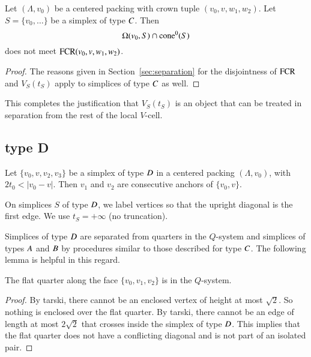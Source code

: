 \begin{lemma}
Let $(\Lambda,v_0)$ be a centered packing with crown tuple $(v_0,v,w_1,w_2)$.
Let $S=\{v_0,\ldots\}$ be a simplex of type $C$. Then
$$\Omega(v_0,S) \cap {\operatorname{cone}}^0(S)$$
does not meet ${\operatorname{FCR}}(v_0,v,w_1,w_2)$.
\end{lemma}

\begin{proof}
The reasons given in Section~\ref{sec:separation} for the
disjointness of ${\operatorname{FCR}}$ and $V_S(t_S)$ apply to simplices of
type $C$ as well. 
\end{proof}


This completes the justification that
$V_S(t_S)$ is an object that can be treated in separation from the
rest of the local $V$-cell.

\subsection{type D}%



\begin{lemma}
Let $\{v_0,v,v_2,v_3\}$ be a simplex of type $D$ 
in a centered packing $(\Lambda,v_0)$,
with $2t_0 < |v_0-v|$.
Then $v_1$ and $v_2$ are consecutive anchors of
$\{v_0,v\}$.
\end{lemma}

On simplices $S$ of type $D$, we label vertices so that the
upright diagonal is the first edge.  We use $t_S=+\infty$ (no
truncation).  

Simplices of type $D $ are separated from quarters in the
$Q$-system and simplices of types $A$ and $B$ by procedures
similar to those described for type $C$.  The following lemma is
helpful in this regard.


\begin{lemma}
The flat quarter along the face $\{v_0,v_1,v_2\}$ is
in the $Q$-system.
\end{lemma}

\begin{proof}
By tarski, there cannot be an enclosed vertex
of height at most $\sqrt2$. 
So nothing is enclosed over the flat quarter.
By tarski, there cannot be an edge of length
at most $2\sqrt2$ that crosses inside the simplex of type $D$.
This implies that the flat quarter does not have
a conflicting diagonal and is not part of an isolated pair.
\end{proof}


